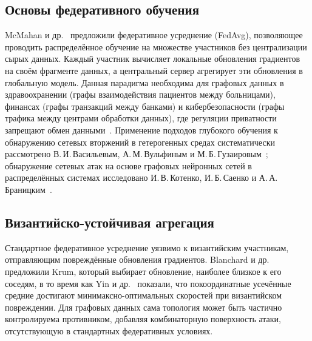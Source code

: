 \label{sec:distributed}%

\subsection{Основы федеративного обучения}

McMahan и др.~\cite{McMahan2017} предложили федеративное усреднение (FedAvg), позволяющее проводить распределённое обучение на множестве участников без централизации сырых данных. Каждый участник вычисляет локальные обновления градиентов на своём фрагменте данных, а центральный сервер агрегирует эти обновления в глобальную модель. Данная парадигма необходима для графовых данных в здравоохранении (графы взаимодействия пациентов между больницами), финансах (графы транзакций между банками) и кибербезопасности (графы трафика между центрами обработки данных), где регуляции приватности запрещают обмен данными~\cite{Kairouz2021,Konecny2016,Mothukuri2021}. Применение подходов глубокого обучения к обнаружению сетевых вторжений в гетерогенных средах систематически рассмотрено В.\,И.\,Васильевым, А.\,М.\,Вульфиным и М.\,Б.\,Гузаировым~\cite{Vasilyev2020idps}; обнаружение сетевых атак на основе графовых нейронных сетей в распределённых системах исследовано И.\,В.\,Котенко, И.\,Б.\,Саенко и А.\,А.\,Браницким~\cite{Kotenko2021gnn}.

\subsection{Византийско-устойчивая агрегация}

Стандартное федеративное усреднение уязвимо к византийским участникам, отправляющим повреждённые обновления градиентов. Blanchard и др.~\cite{Blanchard2017} предложили Krum, который выбирает обновление, наиболее близкое к его соседям, в то время как Yin и др.~\cite{Yin2018} показали, что покоординатные усечённые средние достигают минимаксно-оптимальных скоростей при византийском повреждении. Для графовых данных сама топология может быть частично контролируема противником, добавляя комбинаторную поверхность атаки, отсутствующую в стандартных федеративных условиях.

